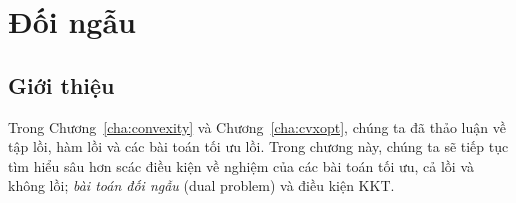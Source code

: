 \chapter{Đối ngẫu}
\label{cha:duality} 
 
 
 
 
\section{Giới thiệu }
Trong Chương~\ref{cha:convexity} và Chương~\ref{cha:cvxopt}, chúng ta đã
thảo luận về tập lồi, hàm lồi và các bài toán tối ưu lồi. Trong chương này, chúng ta sẽ tiếp tục
tìm hiểu sâu hơn scác điều kiện về nghiệm của các bài toán tối ưu, cả
lồi và không lồi; \textit{bài toán đối ngẫu} ({dual problem}) và điều
kiện KKT.
 
 
 
